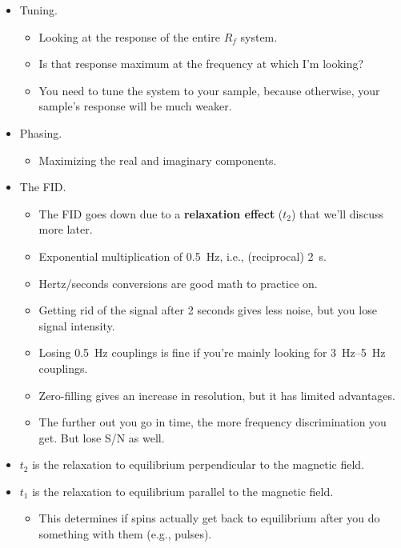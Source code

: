 \documentclass[../notes.tex]{subfiles}
\begin{document}
\begin{itemize}
\begin{itemize}
\begin{itemize}
        \end{itemize}
    \end{itemize}
    \item Tuning.
    \begin{itemize}
        \item Looking at the response of the entire $R_f$ system.
        \item Is that response maximum at the frequency at which I'm looking?
        \item You need to tune the system to your sample, because otherwise, your sample's response will be much weaker.
    \end{itemize}
    \item Phasing.
    \begin{itemize}
        \item Maximizing the real and imaginary components.
    \end{itemize}
    \item The FID.
    \begin{itemize}
        \item The FID goes down due to a \textbf{relaxation effect} ($t_2$) that we'll discuss more later.
        \item Exponential multiplication of \SI{0.5}{\hertz}, i.e., (reciprocal) \SI{2}{\second}.
        \item Hertz/seconds conversions are good math to practice on.
        \item Getting rid of the signal after 2 seconds gives less noise, but you lose signal intensity.
        \item Losing \SI{0.5}{\hertz} couplings is fine if you're mainly looking for \SIrange{3}{5}{\hertz} couplings.
        \item Zero-filling gives an increase in resolution, but it has limited advantages.
        \item The further out you go in time, the more frequency discrimination you get. But lose S/N as well.
    \end{itemize}
    \item $t_2$ is the relaxation to equilibrium perpendicular to the magnetic field.
    \item $t_1$ is the relaxation to equilibrium parallel to the magnetic field.
    \begin{itemize}
        \item This determines if spins actually get back to equilibrium after you do something with them (e.g., pulses).
    \end{itemize}

\end{itemize}
\end{document}
